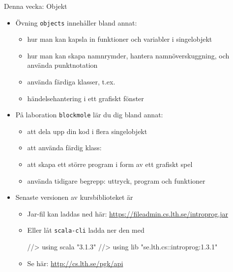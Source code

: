 
\ifkompendium\else
\begin{SlideExtra}{Denna vecka: Objekt}
\begin{itemize}\SlideFontSmall
\item Övning \texttt{objects} innehåller bland annat:
\begin{itemize}\SlideFontTiny
\item hur man kan kapsla in funktioner och variabler i singelobjekt
\item hur man kan skapa namnrymder, hantera namnöverskuggning, och använda punktnotation
\item använda färdiga klasser, t.ex. 
\item händelsehantering i ett grafiskt fönster
\end{itemize}

\item På laboration \texttt{blockmole} lär du dig bland annat:
\begin{itemize}\SlideFontTiny
  \item att dela upp din kod i flera singelobjekt
  \item att använda färdig klass: 
  \item att skapa ett större program i form av ett grafiskt spel
  \item använda tidigare begrepp: uttryck, program och funktioner
\end{itemize}

\item Senaste versionen av kursbiblioteket  är \Emph{\LibVersion} 
\begin{itemize}\SlideFontTiny
\item Jar-fil kan laddas ned här: \url{https://fileadmin.cs.lth.se/introprog.jar}
\item Eller låt \texttt{scala-cli} ladda ner den med
\begin{Code}
//> using scala "3.1.3"
//> using lib "se.lth.cs::introprog:1.3.1"  
\end{Code} 
\item Se  här: \url{http://cs.lth.se/pgk/api}
\end{itemize}
\end{itemize}
\end{SlideExtra}
\fi


